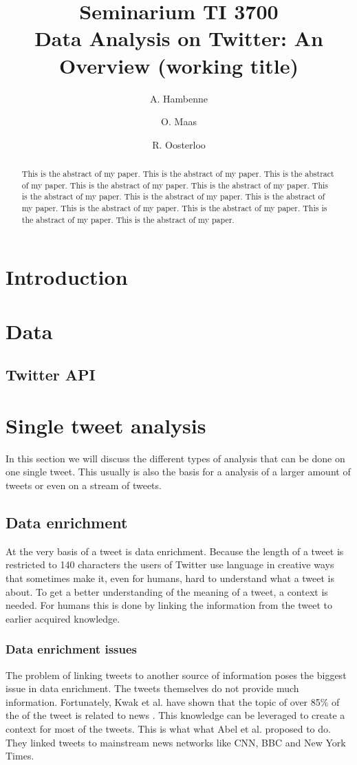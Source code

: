 \documentclass{article}
\title{Seminarium TI 3700\\ Data Analysis on Twitter: An Overview (working title)}
\author{A. Hambenne  \and
    O. Maas \and
    R. Oosterloo}
\date{}
\begin{document}
\maketitle
\thispagestyle{empty}

\begin{abstract}
This is the abstract of my paper.
This is the abstract of my paper.
This is the abstract of my paper.
This is the abstract of my paper.
This is the abstract of my paper.
This is the abstract of my paper.
This is the abstract of my paper.
This is the abstract of my paper.
This is the abstract of my paper.
This is the abstract of my paper.
This is the abstract of my paper.
This is the abstract of my paper.
\end{abstract}


\section{Introduction}


\section{Data}

\subsection{Twitter API}
\section{Single tweet analysis}
In this section we will discuss the different types of analysis that can be done on one single tweet. This usually is also the basis for a analysis of a larger amount of tweets or even on a stream of tweets. 
\subsection{Data enrichment}
At the very basis of a tweet is data enrichment. Because the length of a tweet is restricted to 140 characters the users of Twitter use language in creative ways that sometimes make it, even for humans, hard to understand what a tweet is about. To get a better understanding of the meaning of a tweet, a context is needed. For humans this is done by linking the information from the tweet to earlier acquired knowledge.
\subsubsection{Data enrichment issues}
The problem of linking tweets to another source of information poses the biggest issue in data enrichment. The tweets themselves do not provide much information. Fortunately, Kwak et al. have shown that the topic of over 85\% of the of the tweet is related to news \cite{newsmedia}. This knowledge can be leveraged to create a context for most of the tweets.  This is what what Abel et al. proposed to do\cite{enrichmentForProfiling}. They linked tweets to mainstream news networks like CNN, BBC and New York Times.
\end{document}
